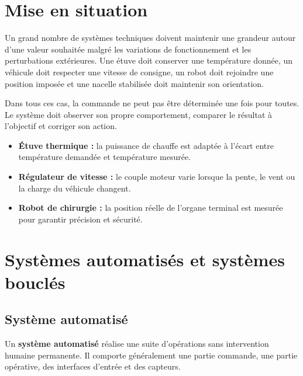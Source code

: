 
\section{Mise en situation}\label{sec:sa-mise-situation}

Un grand nombre de systèmes techniques doivent maintenir une grandeur autour d'une valeur souhaitée malgré les variations de fonctionnement et les perturbations extérieures. Une étuve doit conserver une température donnée, un véhicule doit respecter une vitesse de consigne, un robot doit rejoindre une position imposée et une nacelle stabilisée doit maintenir son orientation.

Dans tous ces cas, la commande ne peut pas être déterminée une fois pour toutes. Le système doit observer son propre comportement, comparer le résultat à l'objectif et corriger son action.

\begin{SAapplication}[title={Trois situations typiques}]
\begin{itemize}
  \item \textbf{Étuve thermique :} la puissance de chauffe est adaptée à l'écart entre température demandée et température mesurée.
  \item \textbf{Régulateur de vitesse :} le couple moteur varie lorsque la pente, le vent ou la charge du véhicule changent.
  \item \textbf{Robot de chirurgie :} la position réelle de l'organe terminal est mesurée pour garantir précision et sécurité.
\end{itemize}
\end{SAapplication}

\SASchemaEtuve

\section{Systèmes automatisés et systèmes bouclés}\label{sec:sa-definitions}

\subsection{Système automatisé}

\begin{SAdefinition}
Un \textbf{système automatisé} réalise une suite d'opérations sans intervention humaine permanente. Il comporte généralement une partie commande, une partie opérative, des interfaces d'entrée et des capteurs.
\end{SAdefinition}

